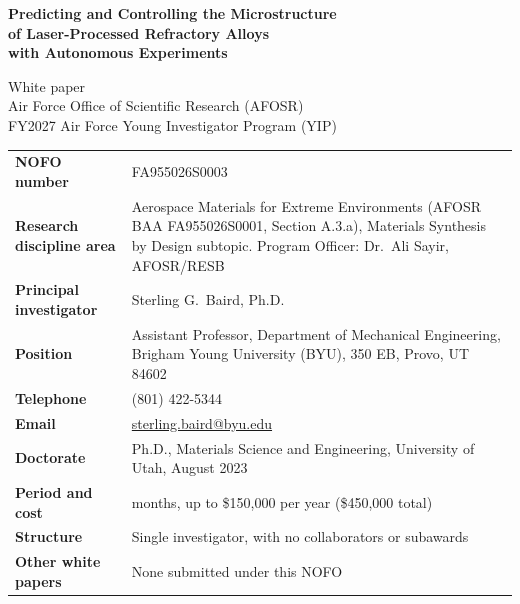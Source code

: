\documentclass[12pt,letterpaper]{article}
\begin{document}
\begin{titlepage}
\begin{center}
{\Large\bfseries Predicting and Controlling the Microstructure\\
of Laser-Processed Refractory Alloys\\
with Autonomous Experiments\par}
\vspace{18pt}
White paper\\
Air Force Office of Scientific Research (AFOSR)\\
FY2027 Air Force Young Investigator Program (YIP)
\end{center}
\vspace{18pt}
\begin{tabular}{@{}>{\bfseries}p{1.9in}>{\raggedright\arraybackslash}p{4.4in}@{}}
NOFO number & FA955026S0003 \\
Research discipline area & Aerospace Materials for Extreme Environments
  (AFOSR BAA FA955026S0001, Section A.3.a), Materials Synthesis by Design
  subtopic. Program Officer: Dr.~Ali Sayir, AFOSR/RESB \\
Principal investigator & Sterling G.\ Baird, Ph.D. \\
Position & Assistant Professor, Department of Mechanical Engineering,
  Brigham Young University (BYU), 350 EB, Provo, UT 84602 \\
Telephone & (801) 422-5344 \\
Email & \href{mailto:sterling.baird@byu.edu}{sterling.baird@byu.edu} \\
Doctorate & Ph.D., Materials Science and Engineering, University of Utah,
  August 2023 \\
Period and cost & 36 months, up to \$150,000 per year (\$450,000 total) \\
Structure & Single investigator, with no collaborators or subawards \\
Other white papers & None submitted under this NOFO \\
\end{tabular}
\end{titlepage}

\setcounter{page}{1}

\end{document}
